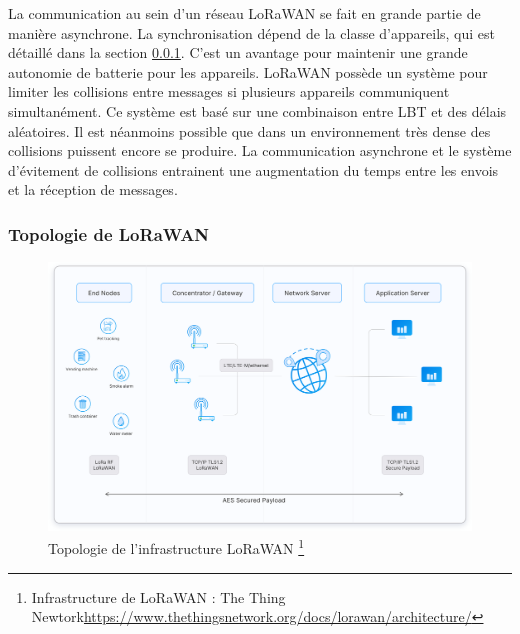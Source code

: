 \vspace{0.1cm}

La communication au sein d'un réseau LoRaWAN se fait en grande partie de manière asynchrone. La synchronisation dépend de la classe d'appareils, qui est détaillé dans la section \ref{topolora}. C'est un avantage pour maintenir une grande autonomie de batterie pour les appareils. LoRaWAN possède un système pour limiter les collisions entre messages si plusieurs appareils communiquent simultanément. Ce système est basé sur une combinaison entre \ac{LBT} et des délais aléatoires\cite{loracolision}. Il est néanmoins possible que dans un environnement très dense des collisions puissent encore se produire. La communication asynchrone et le système d'évitement de collisions entrainent une augmentation du temps entre les envois et la réception de messages.

\subsubsection{Topologie de LoRaWAN}\label{topolora}

\begin{figure}[h]
\centering

\includegraphics[scale=0.1]{images/architecture.png}
\caption{Topologie de l'infrastructure LoRaWAN \protect\footnote{Infrastructure de LoRaWAN : The Thing Newtork\href{https://www.thethingsnetwork.org/docs/lorawan/architecture/}{https://www.thethingsnetwork.org/docs/lorawan/architecture/}}}\label{term7}
\end{figure}

